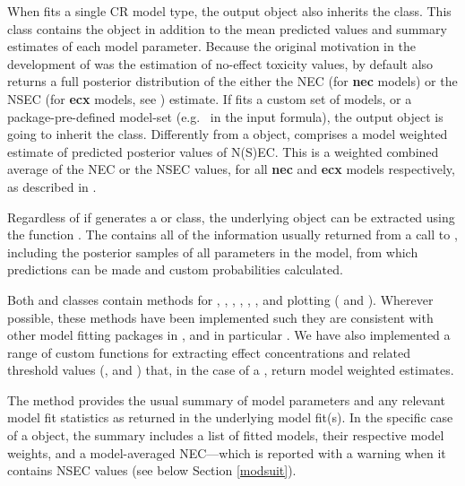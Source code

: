 \documentclass[
  shortnames]{jss}
\begin{document}
When  fits a single CR model type, the output object also inherits the  class. This class contains the  object in addition to the mean predicted values and summary estimates of each model parameter. Because the original motivation in the development of  was the estimation of no-effect toxicity values, by default  also returns a full posterior distribution of the either the NEC (for \textbf{nec} models) or the NSEC (for \textbf{ecx} models, see \citet{Fisher2023}) estimate. If  fits a custom set of models, or a package-pre-defined model-set (e.g.~ in the input formula), the output object is going to inherit the  class. Differently from a  object,  comprises a model weighted estimate of predicted posterior values of N(S)EC. This is a weighted combined average of the NEC or the NSEC values, for all \textbf{nec} and \textbf{ecx} models respectively, as described in \citet{fisher2023ieam}.

Regardless of if  generates a  or  class, the underlying  object can be extracted using the function . The  contains all of the information usually returned from a call to , including the posterior samples of all parameters in the model, from which predictions can be made and custom probabilities calculated.

Both  and  classes contain methods for , , , , , ,  and plotting ( and \newline {}). Wherever possible, these methods have been implemented such they are consistent with other model fitting packages in , and in particular . We have also implemented a range of custom functions for extracting effect concentrations and related threshold values (,  and ) that, in the case of a , return model weighted estimates.

The  method provides the usual summary of model parameters and any relevant model fit statistics as returned in the underlying  model fit(s). In the specific case of a  object, the summary includes a list of fitted models, their respective model weights, and a model-averaged NEC---which is reported with a warning when it contains NSEC values (see below Section \ref{modsuit}).
\end{document}
